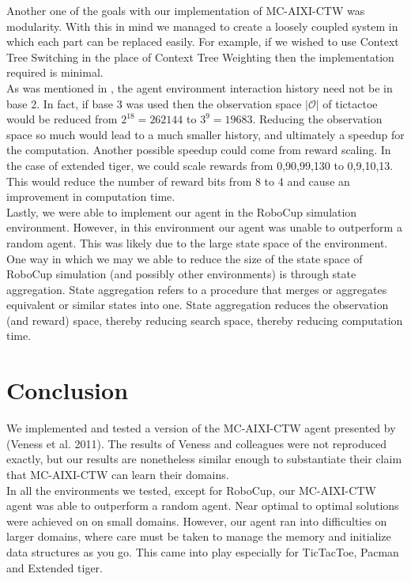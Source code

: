 \documentclass{article}
\theoremstyle{definition}
\newtheorem{primary statistics}[definition]{Primary Statistics}
\newtheorem{auxiliary statistics}[definition]{Auxiliary Statistics}
\begin{document}
Another one of the goals with our implementation of MC-AIXI-CTW was modularity. With this in mind we managed to create a loosely coupled system in which each part can be replaced easily. For example, if we wished to use Context Tree Switching \citep{veness2012context} in the place of Context Tree Weighting then the implementation required is minimal. \\

As was mentioned in \citep{veness2011monte}, the agent environment interaction history need not be in base 2. In fact, if base 3 was used then the observation space $|\mathcal{O}|$ of tictactoe would be reduced from $2^{18}=262144$ to $3^9 = 19683$. Reducing the observation space so much would lead to a much smaller history, and ultimately a speedup for the computation. Another possible speedup could come from reward scaling. In the case of extended tiger, we could scale rewards from 0,90,99,130 to 0,9,10,13. This would reduce the number of reward bits from 8 to 4 and cause an improvement in computation time. \\

Lastly, we were able to implement our agent in the RoboCup simulation environment. However, in this environment our agent was unable to outperform a random agent. This was likely due to the large state space of the environment. One way in which we may we able to reduce the size of the state space of RoboCup simulation (and possibly other environments) is through state aggregation. State aggregation refers to a procedure that merges or aggregates equivalent or similar states into one. State aggregation reduces the observation (and reward) space, thereby reducing search space, thereby reducing computation time.

\section{Conclusion}
We implemented and tested a version of the MC-AIXI-CTW agent presented by (Veness et al. 2011). The results of Veness and colleagues were not reproduced exactly, but our results are nonetheless similar enough to substantiate their claim that MC-AIXI-CTW can learn their domains. \\

In all the environments we tested, except for RoboCup, our MC-AIXI-CTW agent was able to outperform a random agent. Near optimal to optimal solutions were achieved on on small domains. However, our agent ran into difficulties on larger domains, where care must be taken to manage the memory and initialize data structures as you go. This came into play especially for TicTacToe, Pacman and Extended tiger. \\
\end{document}
